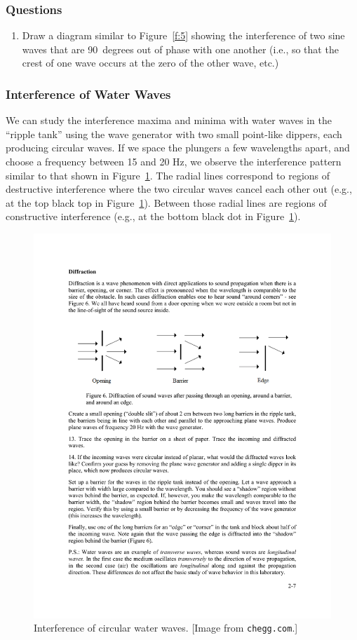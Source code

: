 \documentclass[11pt]{NSF}
\def\ben{\begin{enumerate}}
\def\een{\end{enumerate}}
\def\i{\item{}}
\begin{document}
\subsubsection*{Questions}
\ben

\i Draw a diagram similar to Figure~\ref{f:5} 
showing the interference of two sine waves that are 90~degrees
out of phase with one another 
(i.e., so that the crest of one wave occurs at the zero of the other wave, etc.)

\een

\subsubsection{Interference of Water Waves}

We can study the interference maxima and minima with water waves in the 
``ripple tank” using the wave generator with two small point-like dippers, 
each producing circular waves. 
If we space the plungers a few wavelengths apart, and choose a 
frequency between 15 and 20 Hz, we observe the interference pattern
similar to that shown in Figure~\ref{f:6}.
The radial lines correspond to regions of destructive interference
where the two circular waves cancel each other out (e.g., at the top 
black top in Figure~\ref{f:6}).
Between those radial lines are regions of constructive interference
(e.g., at the bottom black dot in Figure~\ref{f:6}).
%
\begin{figure}[hbtp]
\begin{center}
\includegraphics[width=.5\textwidth]{fig2_6}
\caption{Interference of circular water waves.
[Image from {\tt chegg.com}.]}
\label{f:6}
\end{center}
\end{figure}
%
\end{document}
